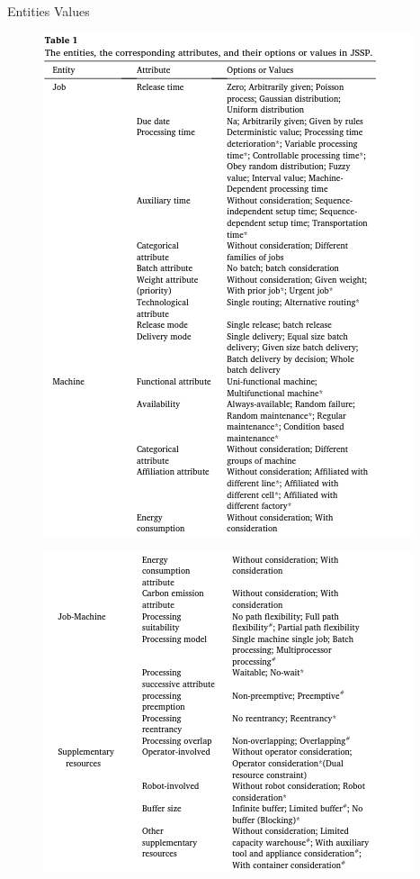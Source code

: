 \documentclass[8pt, xcolor=table]{beamer}
\begin{document}
\begin{frame}[fragile]{Entities Values}
  \begin{minipage}[t]{0.4\textwidth}
    \begin{figure}[H]
      \includegraphics[width=\textwidth]{img/entities1.png}
    \end{figure}
  \end{minipage}
  \begin{minipage}[t]{0.5\textwidth}
    \begin{figure}[H]
      \includegraphics[width=\textwidth]{img/entities2.png}

\end{figure}
\end{minipage}
\end{frame}
\end{document}
